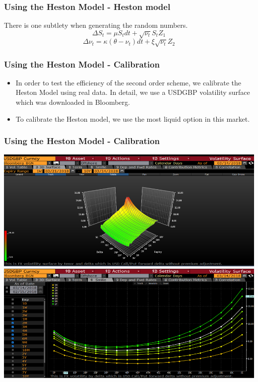 \documentclass[12pt]{beamer}
\begin{document}
\begin{frame}
\frametitle{Using the Heston Model - Heston model}
There is one subtlety when generating the random numbers.
$$\Delta S_t=\mu S_tdt+\sqrt{\nu_t}S_tZ_1$$
$$\Delta\nu_t = \kappa(\theta-\nu_t)dt+\xi\sqrt{\nu_t}Z_2$$
\end{frame}

\begin{frame}
\frametitle{Using the Heston Model - Calibration}
\begin{itemize}
  \item In order to test the efficiency of the second order scheme, we calibrate the Heston Model using real data. In detail, we use a USDGBP volatility surface which was downloaded in Bloomberg.
  \item To calibrate the Heston model, we use the most liquid option in this market.
\end{itemize}
\end{frame}

\begin{frame}
\frametitle{Using the Heston Model - Calibration}
\centering
\includegraphics[width=.75\textwidth]{bloomberg1.png}
\\[.5cm]
\includegraphics[width=.75\textwidth]{bloomberg2.png}
\end{frame}
\end{document}
